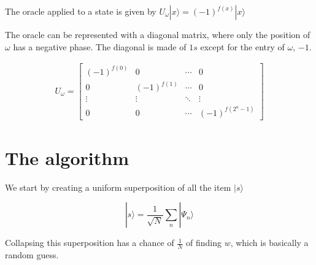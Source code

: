 \documentclass[a4paper]{article}
\begin{document}
The oracle applied to a state is given by \(U_\omega|x\rangle ={(-1)}^{f(x)}|x\rangle\)

The oracle can be represented with a diagonal matrix, where only the position of \(\omega\) has a negative phase.
The diagonal is made of \(1s\) except for the entry of \(\omega\), \(-1\).

\begin{align*}
    U_\omega=
    \begin{bmatrix}
        {(-1)}^{f(0)} & 0 & \cdots & 0 \\
        0 & {(-1)}^{f(1)} & \cdots & 0 \\
        \vdots & \vdots & \ddots & \vdots \\
        0 & 0 & \cdots & {(-1)}^{f(2^n-1)}
    \end{bmatrix}
\end{align*}

\section{The algorithm}

We start by creating a uniform superposition of all the item \(|s\rangle\)

\[
    |s\rangle=\frac{1}{\sqrt{N}}\sum_{n}|\Psi_n\rangle
\]

Collapsing this superposition has a chance of \(\frac{1}{N}\) of finding \(w\), which is basically a random guess.
\end{document}

